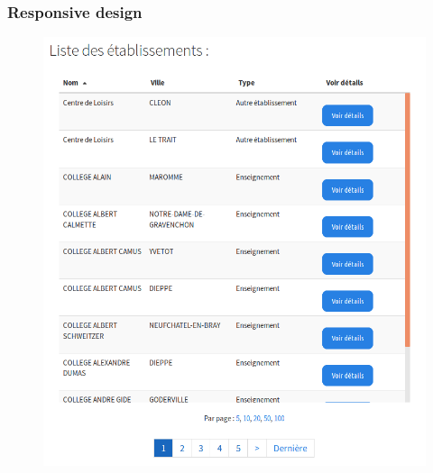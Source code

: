 \begin{frame}
\frametitle{Responsive design}
	\begin{multicols}{2}
		\begin{figure}[!h]
			\begin{center}
				\includegraphics[scale=0.19]{images/screenshot1.png}


\end{center}
\end{figure}
\end{multicols}
\end{frame}
